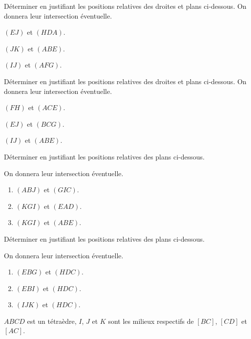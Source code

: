 \documentclass{cornouaille}
\begin{document}
\begin{colonne*exercice}
\begin{exercice}
  Déterminer en justifiant les positions relatives des droites et
  plans ci-dessous. On donnera leur intersection éventuelle.
  \begin{colenumerate}{2}
  \item $(EJ)$ et $(HDA)$.
  \item $(JK)$ et $(ABE)$.
  \item $(IJ)$ et $(AFG)$.
  \end{colenumerate}
\end{exercice}

\begin{exercice}
  Déterminer en justifiant les positions relatives des droites et
  plans ci-dessous. On donnera leur intersection éventuelle.
  \begin{colenumerate}{2}
  \item $(FH)$ et $(ACE)$.
  \item $(EJ)$ et $(BCG)$.
  \item $(IJ)$ et $(ABE)$.
  \end{colenumerate}
\end{exercice}

\columnbreak

\begin{exercice}
  Déterminer en justifiant les positions relatives des plans
  ci-dessous. 

  On donnera leur intersection éventuelle.
  \begin{enumerate}
  \item $(ABJ)$ et $(GIC)$.
  \item $(KGI)$ et $(EAD)$.
  \item $(KGI)$ et $(ABE)$.
  \end{enumerate}
\end{exercice}

\begin{exercice}\label{G2Exo17}
  Déterminer en justifiant les positions relatives des plans
  ci-dessous. 

  On donnera leur intersection éventuelle.
  \begin{enumerate}
  \item $(EBG)$ et $(HDC)$.
  \item $(EBI)$ et $(HDC)$.
  \item $(IJK)$ et $(HDC)$.
  \end{enumerate}
\end{exercice}

\begin{exercice}
  $ABCD$ est un tétraèdre, $I$, $J$ et $K$ sont les milieux respectifs
  de $[BC]$, $[CD]$ et $[AC]$.


\end{exercice}
\end{colonne*exercice}
\end{document}
